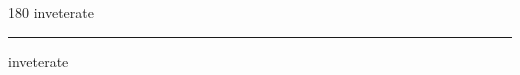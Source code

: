 
\begin{frame}
\begin{center}
\begin{turn}{180}
{\fontsize{2.5cm}{1em}\selectfont inveterate}
\end{turn}
\vspace{1em}\par  
\hrule
\vspace{1em}\par  
{\fontsize{2.5cm}{1em}\selectfont inveterate}
\end{center}
\end{frame}
